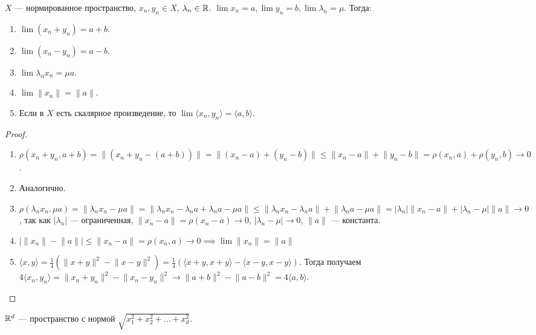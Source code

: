 \begin{theorem}
    $X$ --- нормированное пространство,  $x_n, y_n \in X$,  $\lambda_n \in \mathbb{R}$.  $\lim x_n = a, \lim y_n = b, \lim \lambda_n = \mu$. Тогда:
     \begin{enumerate}
         \item $\lim (x_n + y_n) = a+b$.
         \item  $\lim(x_n - y_n) = a-b$.
         \item  $\lim \lambda_nx_n = \mu a$.
         \item  $\lim \lVert x_n\rVert = \lVert a \rVert$.
         \item  Если в  $X$ есть скалярное произведение, то  $\lim \langle x_n, y_n \rangle = \langle a, b \rangle$.
    \end{enumerate}
\end{theorem}
\begin{proof}
    \begin{enumerate}
        \item $\rho(x_n+y_n, a+b) = \lVert (x_n+y_n - (a+b)) \rVert = \lVert (x_n-a) + (y_n-b) \rVert \le \lVert x_n - a \rVert + \lVert y_n - b \rVert = \rho(x_n, a) + \rho(y_n, b) \to 0$.
        \item Аналогично.
        \item $\rho(\lambda_nx_n, \mu a) = \lVert \lambda_n x_n - \mu a\rVert = \lVert \lambda_n x_n - \lambda_n a + \lambda_n a - \mu a \rVert \le \lVert \lambda_n x_n - \lambda_n a \rVert + \lVert \lambda_n a - \mu a \rVert = |\lambda_n| \lVert x_n - a \rVert + |\lambda_n -\mu| \lVert a \rVert \to 0$, так как $|\lambda_n|$ --- ограниченная, $\lVert x_n - a \rVert = \rho(x_n - a) \to 0$,  $|\lambda_n -\mu| \to 0$, $\lVert a \rVert$ --- константа.  
        \item $| \lVert x_n \rVert - \lVert a \rVert| \le \lVert x_n - a \rVert = \rho(x_n, a) \to 0 \implies \lim \lVert x_n \rVert = \lVert a \rVert$
        \item $\langle x, y \rangle = \frac{1}{4}(\lVert x+y \rVert^2 - \lVert x-y \rVert^2) = \frac{1}{4}(\langle x+y, x+y\rangle - \langle x-y, x-y\rangle)$. Тогда получаем $4 \langle x_n, y_n \rangle = \lVert x_n + y_n \rVert^2 - \lVert x_n - y_n \rVert^2 \to \lVert a + b \rVert^2 - \lVert a - b \rVert^2 = 4 \langle a, b \rangle$.
    \end{enumerate}
\end{proof}
\begin{definition}
    $\mathbb{R}^d$ --- пространство с нормой  $\sqrt{x_1^2 + x_2^2 + \ldots + x_d^2}$.
\end{definition}
